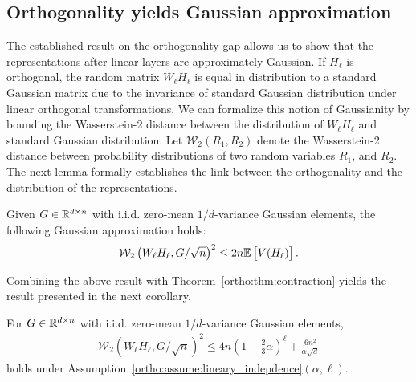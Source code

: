 \subsection{Orthogonality yields Gaussian approximation}
The established result on the orthogonality gap allows us to show that the representations after linear layers are approximately Gaussian. If $H_\ell$ is orthogonal, the random matrix $W_\ell H_\ell$ is equal in distribution to a standard Gaussian matrix due to the invariance of standard Gaussian distribution under linear orthogonal transformations. We can formalize this notion of Gaussianity by bounding the Wasserstein-2 distance between the distribution of $W_\ell H_\ell$ and standard Gaussian distribution. Let $\mathcal{W}_2(R_1,R_2)$ denote the Wasserstein-2 distance between probability distributions of two random variables $R_1$, and $R_2$.
The next lemma formally establishes the link between the orthogonality and the distribution of the representations. 
\begin{lemma} \label{ortho:lemma:wv_bound}
Given $G \in \mathbb{R}^{d\times n}$ with i.i.d. zero-mean $1/d$-variance Gaussian elements, the following Gaussian approximation holds:
\begin{align}
\label{ortho:eq:bn_recurrence}
    \mathcal{W}_2\left( W_\ell H_\ell , 
    G/\sqrt{n}\right)^2 \leq 2 n \mathbb{E} \left[ V(H_\ell) \right].
\end{align}
\end{lemma}
Combining the above result with Theorem~\ref{ortho:thm:contraction} yields the result presented in the next corollary.
\begin{corollary} \label{ortho:cor:gaussian_approximation}
For $G \in \mathbb{R}^{d\times n}$ with i.i.d. zero-mean $1/d$-variance Gaussian elements, 
\begin{align}
    \mathcal{W}_2\left( W_\ell H_\ell, G/\sqrt{n}\right)^2 \leq 4n \left(1-\frac{2}{3}\alpha\right)^{\ell}+ \frac{6 n^2}{\alpha\sqrt{d}}
\end{align}
holds under Assumption~\ref{ortho:assume:lineary_indepdence}$(\alpha,\ell)$.
\end{corollary}


